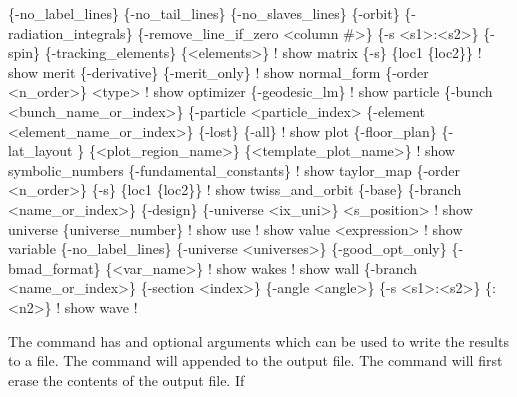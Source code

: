 {{{{\begin{example}
        \{-no_label_lines\} \{-no_tail_lines\} \{-no_slaves_lines\} \{-orbit\} 
        \{-radiation_integrals\} \{-remove_line_if_zero <column \#>\} \{-s <s1>:<s2>\} 
        \{-spin\} \{-tracking_elements\} \{<elements>\}                     ! 
  show matrix \{-s\} \{loc1 \{loc2\}\}                                      ! 
  show merit \{-derivative\} \{-merit_only\}                              ! 
  show normal_form \{-order <n_order>\} <type>                          ! 
  show optimizer \{-geodesic_lm\}                                       ! 
  show particle \{-bunch <bunch_name_or_index>\} \{-particle <particle_index> 
        \{-element <element_name_or_index>\} \{-lost\} \{-all\}             ! 
  show plot \{-floor_plan\} \{-lat_layout \} \{<plot_region_name>\} 
        \{<template_plot_name>\}                                        ! 
  show symbolic_numbers \{-fundamental_constants\}                      ! 
  show taylor_map \{-order <n_order>\} \{-s\} \{loc1 \{loc2\}\}               ! 
  show twiss_and_orbit \{-base\} \{-branch <name_or_index>\} \{-design\} 
        \{-universe <ix_uni>\} <s_position>                             ! 
  show universe \{universe_number\}                                     ! 
  show use                                                            ! 
  show value <expression>                                             ! 
  show variable \{-no_label_lines\} \{-universe <universes>\}            
         \{-good_opt_only\} \{-bmad_format\} \{<var_name>\}                 ! 
  show wakes                                                          ! 
  show wall \{-branch <name_or_index>\} \{-section <index>\} \{-angle <angle>\} 
        \{-s <s1>:<s2>\} \{<n1>:<n2>\}                                    ! 
  show wave                                                           ! 
\end{example}

\vskip 10pt 

The  command has  and  optional arguments which can be
used to write the results to a file.  The  command will appended to the
output file. The  command will first erase the contents of the output
file. If \vn{global%
substituted for the \vn{*}. The value of the number starts at \vn{001} and increases by 1
each time \vn{show -write} is used.  Example:
\begin{example}
  show -write orb.dat orbit    ! Write orbit data to the file "orb.dat".
\end{example}

}}}}}
